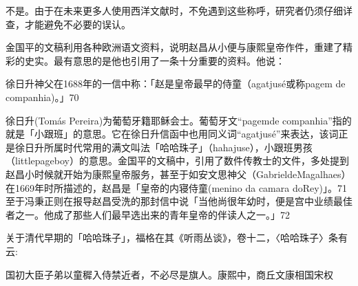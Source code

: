 \vfill
\begin{BookNotes}
\end{BookNotes}

\noindent 不是。由于在未来更多人使用西洋文献时，不免遇到这些称呼，研究者仍须仔细详查，才能避免不必要的误认。


金国平的文稿利用各种欧洲语文资料，说明赵昌从小便与康熙皇帝作件，重建了精彩的史实。最有意思的是他也引用了一条十分重要的资料。他说：

\begin{BookQuote}
徐日升神父在1688年的一信中称：「赵是皇帝最早的侍童（agatjusé或称pagem de companhia)。」70
\end{BookQuote}

徐日升(Tomás Pereira)为葡萄牙籍耶稣会士。葡萄牙文“pagemde companhia”指的就是「小跟班」的意思。它在徐日升信函中也用同义词“agatjusé”来表达，该词正是徐日升所属时代常用的满文叫法「哈哈珠子」（hahajuse），小跟班男孩（littlepageboy）的意思。金国平的文稿中，引用了数件传教士的文件，多处提到赵昌小时候就开始为康熙皇帝服务，甚至于如安文思神父（GabrieldeMagalhaes）在1669年时所描述的，赵昌是「皇帝的内寝侍童(menino da camara doRey)」。71至于冯秉正则在报导赵昌受洗的那封信中说「当他尚很年幼时，便是宫中业绩最佳者之一。他成了那些人们最早选出来的青年皇帝的伴读人之一。」72

关于清代早期的「哈哈珠子」，福格在其《听雨丛谈》，卷十二，〈哈哈珠子〉条有云:

\begin{BookQuote}
国初大臣子弟以童穉入侍禁近者，不必尽是旗人。康熙中，商丘文康相国宋权
\end{BookQuote}


